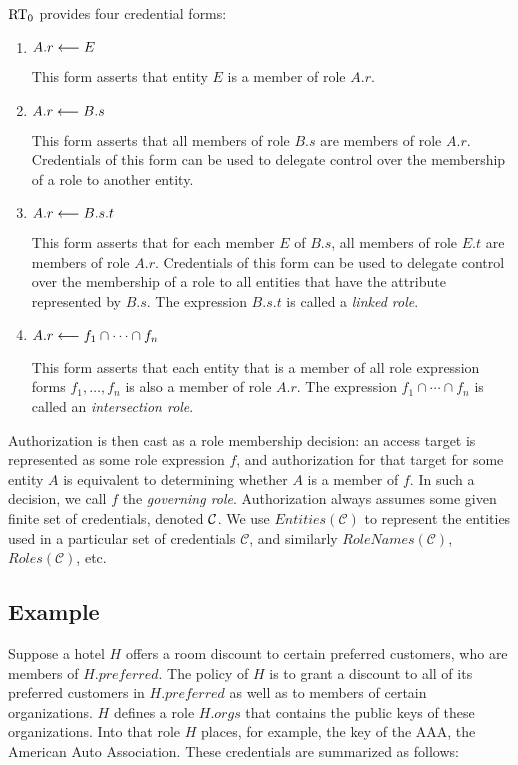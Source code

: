 $\RT_0$ provides four credential forms:
\begin{enumerate}

\item $\cred{A.r}{E}{}$ 

 This form asserts that entity $E$ is a member of role $A.r$.

\item $\cred{A.r}{B.s}{}$ 

  This form asserts that all members of role $B.s$
  are members of role $A.r$. Credentials of this form can be used to
  delegate control over the membership of a role to another entity.

\item $\cred{A.r}{B.s.t}{}$ 

  This form asserts that for each member $E$ of
  $B.s$, all members of role $E.t$ are members of role
  $A.r$. Credentials of this form can be used to delegate control over
  the membership of a role to all entities that have the attribute
  represented by $B.s$.  The expression $B.s.t$ is called a 
  \emph{linked role}.

\item $\cred{A.r}{f_1 \cap \cdots \cap f_n}{}$
  
  This form asserts that each entity that is a member of all role
  expression forms $f_1,\ldots, f_n$ is also a member of role
  $A.r$. The expression $f_1 \cap \cdots \cap f_n$ is called an
  \emph{intersection role}.

\end{enumerate}
Authorization is then cast as a role membership decision: an access
target is represented as some role expression $f$, and authorization
for that target for some entity $A$ is equivalent to determining
whether $A$ is a member of $f$.  In such a decision, we call $f$ the
\emph{governing role}.  Authorization always assumes some given finite
set of credentials, denoted $\creds$.  We use
$\mathit{Entities(\mathcal{C})}$ to represent the entities used in a
particular set of credentials $\mathcal{C}$, and similarly
$\mathit{RoleNames(\mathcal{C})}$, $\mathit{Roles(\mathcal{C})}$, etc.

\subsection{Example}

Suppose a hotel $H$ offers a room discount to certain preferred
customers, who are members of $H.\mathit{preferred}$. The policy of
$H$ is to grant a discount to all of its preferred customers in
$H.\mathit{preferred}$ as well as to members of certain organizations.
$H$ defines a role $H.\mathit{orgs}$ that contains the public keys of
these organizations. Into that role $H$ places, for example, the key
of the AAA, the American Auto Association. These
credentials are summarized as follows:
\begin{mathpar}


\end{mathpar}

